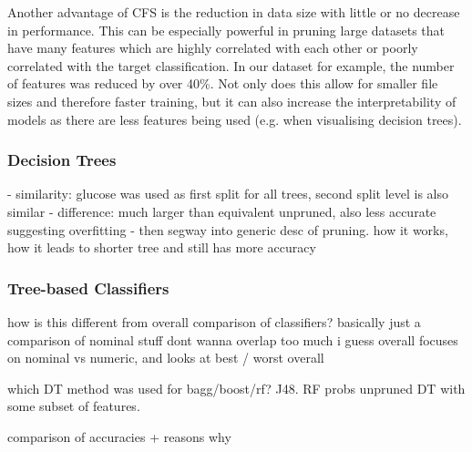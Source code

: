 Another advantage of CFS is the reduction in data size with little or no decrease in performance. This can be especially powerful in pruning large datasets that have many features which are highly correlated with each other  or poorly correlated with the target classification. In our dataset for example, the number of features was reduced by over 40\%. Not only does this allow for smaller file sizes and therefore faster training, but it can also increase the interpretability of models as there are less features being used (e.g. when visualising decision trees).



\subsubsection{Decision Trees}




- similarity: glucose was used as first split for all trees, second split level is also similar
- difference: much larger than equivalent unpruned, also less accurate suggesting overfitting
- then segway into generic desc of pruning. how it works, how it leads to shorter tree and still has more accuracy



\subsubsection{Tree-based Classifiers}


how is this different from overall comparison of classifiers? basically just a comparison of nominal stuff
dont wanna overlap too much
i guess overall focuses on nominal vs numeric, and looks at best / worst overall

which DT method was used for bagg/boost/rf? J48. 
RF probs unpruned DT with some subset of features.

comparison of accuracies + reasons why


